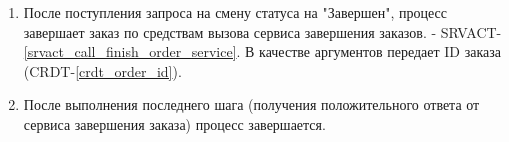 \begin{alg}
\begin{enumerate}
          \item После поступления запроса на смену статуса на "Завершен", процесс завершает заказ по средствам вызова сервиса завершения заказов. - SRVACT-\ref{srvact_call_finish_order_service}. В качестве аргументов передает ID заказа (CRDT-\ref{crdt_order_id}).

          \item После выполнения последнего шага (получения положительного ответа от сервиса завершения заказа) процесс завершается.

      	\end{enumerate}

      \end{alg}
